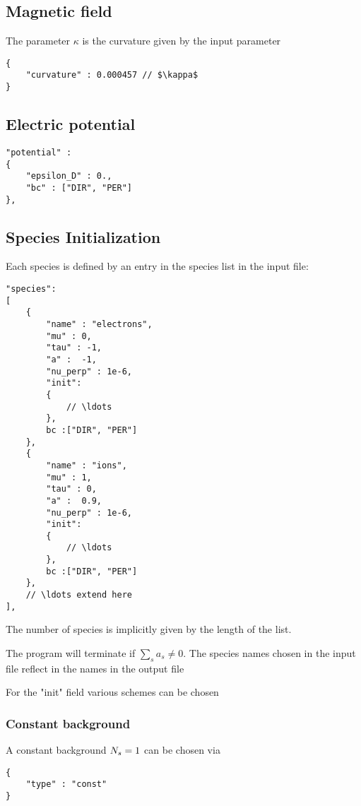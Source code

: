 \subsection{Magnetic field}
The parameter $\kappa$ is the curvature given by the input parameter
\begin{verbatim}
{
    "curvature" : 0.000457 // $\kappa$
}
\end{verbatim}
\subsection{Electric potential}
\begin{verbatim}
"potential" :
{
    "epsilon_D" : 0.,
    "bc" : ["DIR", "PER"]
},
\end{verbatim}

\subsection{Species Initialization}
Each species is defined by an entry in the species list in the input file:
\begin{verbatim}
"species":
[
    {
        "name" : "electrons",
        "mu" : 0,
        "tau" : -1,
        "a" :  -1,
        "nu_perp" : 1e-6,
        "init":
        {
            // \ldots
        },
        bc :["DIR", "PER"]
    },
    {
        "name" : "ions",
        "mu" : 1,
        "tau" : 0,
        "a" :  0.9,
        "nu_perp" : 1e-6,
        "init":
        {
            // \ldots
        },
        bc :["DIR", "PER"]
    },
    // \ldots extend here
],
\end{verbatim}
The number of species is implicitly given by the length of the list.
\begin{tcolorbox}[title=Note]
    The program will terminate if $\sum_s a_s \neq 0$. The species names chosen in the input file reflect in the names in the output file
\end{tcolorbox}

For the "init" field various schemes can be chosen
\subsubsection{Constant background}
A constant background ${N_s}  = 1$ can be chosen via
\begin{verbatim}
{
    "type" : "const"
}
\end{verbatim}
